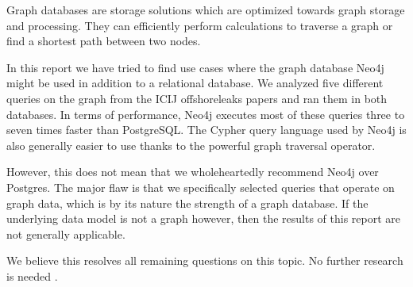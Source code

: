 \documentclass[11pt, a4paper,oneside,chapterprefix=false]{scrbook}
\begin{document}
Graph databases are storage solutions which are optimized towards graph storage and processing.
They can efficiently perform calculations to traverse a graph or find a shortest path between two nodes.

In this report we have tried to find use cases where the graph database Neo4j might be used in addition to a relational database.
We analyzed five different queries on the graph from the ICIJ offshoreleaks papers and ran them in both databases.
In terms of performance, Neo4j executes most of these queries three to seven times faster than PostgreSQL.
The Cypher query language used by Neo4j is also generally easier to use thanks to the powerful graph traversal operator.

However, this does not mean that we wholeheartedly recommend Neo4j over Postgres.
The major flaw is that we specifically selected queries that operate on graph data, which is by its nature the strength of a graph database.
If the underlying data model is not a graph however, then the results of this report are not generally applicable.

We believe this resolves all remaining questions on this topic. No further research is needed \cite{xkcdresearch}.



\end{document}
